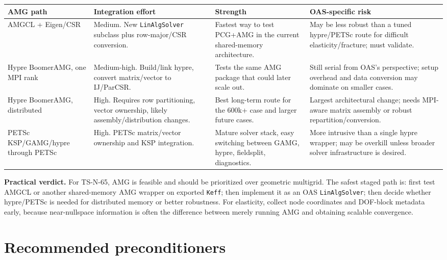 \documentclass[10pt,a4paper]{article}
\newcommand{\code}[1]{\texttt{#1}}
\begin{document}
\begin{table}[h]
\small
\centering
\begin{tabularx}{\textwidth}{L{0.20\textwidth} L{0.22\textwidth} L{0.25\textwidth} Y}
\toprule
AMG path & Integration effort & Strength & OAS-specific risk \\
\midrule
AMGCL + Eigen/CSR & Medium. New \code{LinAlgSolver} subclass plus row-major/CSR conversion. & Fastest way to test PCG+AMG in the current shared-memory architecture. & May be less robust than a tuned hypre/PETSc route for difficult elasticity/fracture; must validate. \\
Hypre BoomerAMG, one MPI rank & Medium-high. Build/link hypre, convert matrix/vector to IJ/ParCSR. & Tests the same AMG package that could later scale out. & Still serial from OAS's perspective; setup overhead and data conversion may dominate on smaller cases. \\
Hypre BoomerAMG, distributed & High. Requires row partitioning, vector ownership, likely assembly/distribution changes. & Best long-term route for the 600k+ case and larger future cases. & Largest architectural change; needs MPI-aware matrix assembly or robust repartition/conversion. \\
PETSc KSP/GAMG/hypre through PETSc & High. PETSc matrix/vector ownership and KSP integration. & Mature solver stack, easy switching between GAMG, hypre, fieldsplit, diagnostics. & More intrusive than a single hypre wrapper; may be overkill unless broader solver infrastructure is desired. \\
\bottomrule
\end{tabularx}
\end{table}

\textbf{Practical verdict.} For TS-N-65, AMG is feasible and should be prioritized over geometric multigrid. The safest staged path is: first test AMGCL or another shared-memory AMG wrapper on exported \code{Keff}; then implement it as an OAS \code{LinAlgSolver}; then decide whether hypre/PETSc is needed for distributed memory or better robustness. For elasticity, collect node coordinates and DOF-block metadata early, because near-nullspace information is often the difference between merely running AMG and obtaining scalable convergence.

\section{Recommended preconditioners}
\end{document}
